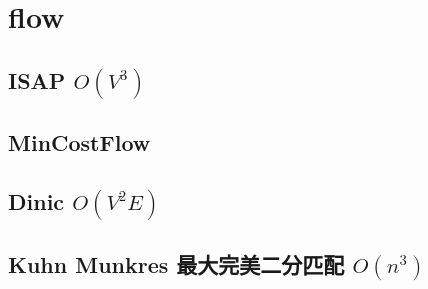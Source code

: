 \documentclass[a4paper,10pt,twocolumn,oneside]{article}
\begin{document}
\section{flow}

\subsection{ISAP $O(V^{3})$}


\subsection{MinCostFlow}


\subsection{Dinic $O(V^{2}E)$}


%

%

\subsection{Kuhn Munkres 最大完美二分匹配 $O(n^{3})$}


%

%

% 
\end{document}
